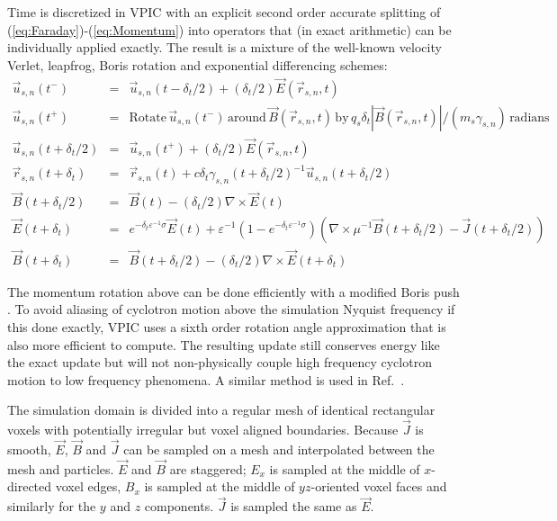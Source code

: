 \documentclass[10pt]{article}
\newcommand{\eps}{\varepsilon}
\newcommand{\vecr}{\vec{r}}
\newcommand{\vecu}{\vec{u}}
\newcommand{\vecJ}{\vec{J}}
\newcommand{\vecE}{\vec{E}}
\newcommand{\vecB}{\vec{B}}
\newcommand{\Curl}[1]{\nabla \times #1}
\newcommand{\eq}[1]{(\ref{eq:#1})}
\begin{document}
Time is discretized in VPIC with an explicit second order accurate
splitting of \eq{Faraday}-\eq{Momentum} into operators that (in exact
arithmetic) can be individually applied exactly.  The result is a
mixture of the well-known velocity Verlet, leapfrog, Boris rotation
and exponential differencing schemes:
\begin{eqnarray}
\vecu_{s,n}\left(t^-\right) &=&\vecu_{s,n}\left(t-\delta_t/2\right) +
  \left(\delta_t/2\right)\vecE\left(\vecr_{s,n},t\right) \\
\vecu_{s,n}\left(t^+\right) &=&
  \textrm{Rotate}\,\vecu_{s,n}\left(t^-\right)\,\textrm{around}\,
  \vecB\left(\vecr_{s,n},t\right)\,\textrm{by}\,
  q_s\delta_t\left|\vecB\left(\vecr_{s,n},t\right)\right| /
  \left(m_s\gamma_{s,n}\right)\,\textrm{radians} \\
\vecu_{s,n}\left(t+\delta_t/2\right) &=&\vecu_{s,n}\left(t^+\right) +
  \left(\delta_t/2\right)\vecE\left(\vecr_{s,n},t\right) \\
\vecr_{s,n}\left(t+\delta_t\right) &=& \vecr_{s,n}\left(t\right) +
  c\delta_t\gamma_{s,n}\left(t+\delta_t/2\right)^{-1}
           \vecu_{s,n}\left(t+\delta_t/2\right) \\
\vecB\left(t+\delta_t/2\right) &=&
  \vecB\left(t\right) -
  \left(\delta_t/2\right)\Curl{\vecE\left(t\right)} \\
\vecE\left(t+\delta_t\right) &=&
  e^{-\delta_t\eps^{-1}\sigma}\vecE\left(t\right) +
  \eps^{-1}\left(1-e^{-\delta_t\eps^{-1}\sigma}\right)
    \left( \Curl{\mu^{-1}\vecB\left(t+\delta_t/2\right)} -
           \vecJ\left(t+\delta_t/2\right) \right) \\
\vecB\left(t+\delta_t\right) &=& \vecB\left(t+\delta_t/2\right) -
  \left(\delta_t/2\right)\Curl{\vecE\left(t+\delta_t\right)}
\end{eqnarray}

The momentum rotation above can be done efficiently with a modified
Boris push \cite{Boris_1970}.  To avoid aliasing of cyclotron motion
above the simulation Nyquist frequency if this done exactly, VPIC uses
a sixth order rotation angle approximation that is also more efficient
to compute.  The resulting update still conserves energy like the
exact update but will not non-physically couple high frequency
cyclotron motion to low frequency phenomena.  A similar method is used
in Ref.~\cite{Blahovec_et_al_2000}.

The simulation domain is divided into a regular mesh of identical
rectangular voxels with potentially irregular but voxel aligned
boundaries.  Because $\vecJ$ is smooth, $\vecE$, $\vecB$ and $\vecJ$
can be sampled on a mesh and interpolated between the mesh and
particles.  $\vecE$ and $\vecB$ are staggered; $E_x$ is sampled at
the middle of $x$-directed voxel edges, $B_x$ is sampled at the middle
of $yz$-oriented voxel faces and similarly for the $y$ and $z$
components.  $\vecJ$ is sampled the same as $\vecE$.
\end{document}

